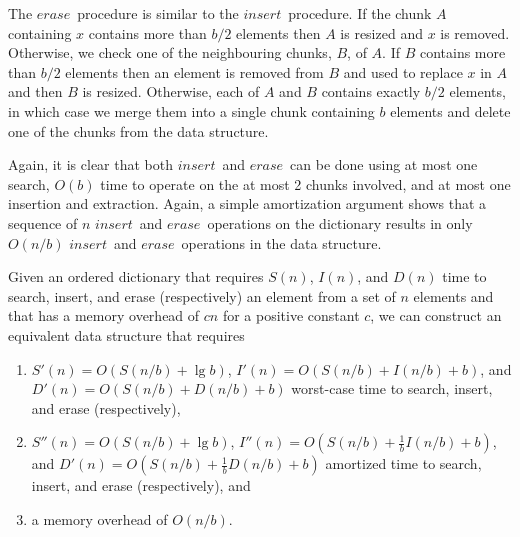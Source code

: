 \documentclass{DIKU-article}
\newcommand{\Erase}{\mbox{$\mathit{erase}$}}
\newcommand{\Insert}{\mbox{$\mathit{insert}$}}
\begin{document}
The \Erase\ procedure is similar to the \Insert\ procedure.  If the
chunk $A$ containing $x$ contains more than $b/2$ elements then $A$ is
resized and $x$ is removed.  Otherwise, we check one of the
neighbouring chunks, $B$, of $A$. If $B$ contains more than $b/2$
elements then an element is removed from $B$ and used to replace $x$
in $A$ and then $B$ is resized. Otherwise, each of $A$ and $B$
contains exactly $b/2$ elements, in which case we merge them into a
single chunk containing $b$ elements and delete one of the chunks from
the data structure.

Again, it is clear that both \Insert\ and \Erase\ can be done using at
most one search, $O(b)$ time to operate on the at most 2 chunks
involved, and at most one insertion and extraction.  Again, a simple
amortization argument shows that a sequence of $n$ \Insert\ and
\Erase\ operations on the dictionary results in only $O(n/b)$ \Insert\
and \Erase\ operations in the data structure.

\begin{theorem}
\label{theorem:elementary-b}
Given an ordered dictionary that requires $S(n)$, $I(n)$, and $D(n)$
time to search, insert, and erase (respectively) an element from a
set of $n$ elements and that has a memory overhead of $cn$ for a
positive constant $c$, we can construct an equivalent data structure
that requires 
\begin{enumerate}
\item $S'(n)=O(S(n/b)+\lg b)$, $I'(n)=O(S(n/b)+I(n/b)+b)$,
and $D'(n)=O(S(n/b)+D(n/b)+b)$ worst-case time to search, insert,
and erase (respectively), 
\item $S''(n)=O(S(n/b)+\lg b)$,
$I''(n)=O(S(n/b)+\frac{1}{b}I(n/b)+b)$, and
$D'(n)=O(S(n/b)+\frac{1}{b}D(n/b)+b)$ amortized time to search,
insert, and erase (respectively), and 
\item a memory overhead of
$O(n/b)$.
\end{enumerate}
\end{theorem}
\end{document}
